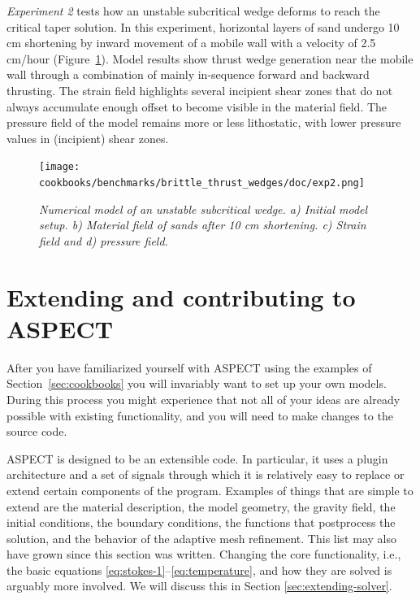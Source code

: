 \documentclass{article}
\newcommand{\aspect}{\textsc{ASPECT}}
\begin{document}
\textit{Experiment 2} tests how an unstable subcritical wedge deforms to reach the
critical taper solution. In this experiment, horizontal layers of sand undergo 10 cm
shortening by inward movement of a mobile wall with a velocity of 2.5 cm/hour
(Figure~\ref{fig:btwexp2}). Model results show thrust wedge generation near the
mobile wall through a combination of mainly in-sequence forward and backward thrusting.
The strain field highlights several incipient shear zones that do not always accumulate
enough offset to become visible in the material field. The pressure field of the model
remains more or less lithostatic, with lower pressure values in (incipient) shear zones.

\begin{figure}
\begin{center}
  \centering
  \texttt{[image: cookbooks/benchmarks/brittle\_thrust\_wedges/doc/exp2.png]}
  \caption{\it Numerical model of an unstable subcritical wedge. a) Initial model setup. b) Material field of sands after 10 cm shortening. c) Strain field and d) pressure field.}
  \label{fig:btwexp2}
\end{center}
\end{figure}



\section{Extending and contributing to \aspect}
\label{sec:extending}

After you have familiarized yourself with \aspect{} using the examples of
Section~\ref{sec:cookbooks} you will invariably want to set up your own models.
During this process you might experience that not all of your ideas are already possible
with existing functionality, and you will need to make changes to the source code.

\aspect{} is designed to be an extensible code. In particular, it
uses a plugin architecture and a set of signals through which it is
relatively easy to replace or extend certain components of the program. Examples of
things that are simple to extend are the material description, the model geometry,
the gravity field, the initial conditions, the boundary conditions,
the functions that postprocess the solution, and the behavior of the adaptive mesh refinement.
This list may also have grown since this section was written. Changing the core functionality, i.e., the basic equations
\eqref{eq:stokes-1}--\eqref{eq:temperature}, and how they are solved is
arguably more involved. We will discuss this in Section
\ref{sec:extending-solver}.
\end{document}
